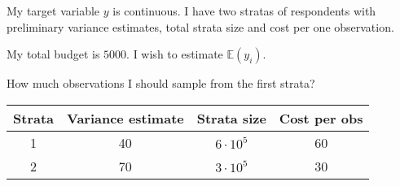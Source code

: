 
\begin{question}
My target variable \(y\) is continuous.
I have two stratas of respondents with preliminary variance estimates,
total strata size and cost per one observation.

My total budget is \(5000\). I wish to estimate \(\mathbb{E}(y_i)\).

How much observations I should sample from the first strata?

\begin{longtable}[]{@{}cccc@{}}
\toprule()
Strata & Variance estimate & Strata size & Cost per obs \\
\midrule()
\endhead
1 & 40 & \(6 \cdot 10^5\) & 60 \\
2 & 70 & \(3 \cdot 10^5\) & 30 \\
\bottomrule()
\end{longtable}
\end{question}


